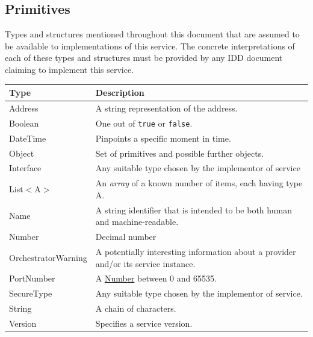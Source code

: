 \documentclass[a4paper]{arrowhead}
\newcommand{\pdef}[1]{{\textcolor{ArrowheadGrey}{#1\label{sec:model:primitives:#1}\label{sec:model:primitives:#1s}\label{sec:model:primitives:#1es}}}}
\newcommand{\pref}[1]{{\textcolor{ArrowheadGrey}{\hyperref[sec:model:primitives:#1]{#1}}}}
\begin{document}
\subsection{Primitives}
\label{sec:model:primitives}

Types and structures mentioned throughout this document that are assumed to be available to implementations of this service.
The concrete interpretations of each of these types and structures must be provided by any IDD document claiming to implement this service.


\begin{table}[ht!]
\begin{tabularx}{\textwidth}{| p{4cm} | X |} \hline
\rowcolor{gray!33} Type & Description \\ \hline
\pdef{Address}          & A string representation of the address. \\ \hline
\pdef{Boolean}          & One out of \texttt{true} or \texttt{false}. \\ \hline
\pdef{DateTime}         & Pinpoints a specific moment in time. \\ \hline
\pdef{Object}           & Set of primitives and possible further objects. \\ \hline
\pdef{Interface}        & Any suitable type chosen by the implementor of service \\ \hline
\pdef{List}$<$A$>$      & An \textit{array} of a known number of items, each having type A. \\ \hline
\pdef{Name}             & A string identifier that is intended to be both human and machine-readable. \\ \hline
\pdef{Number}           & Decimal number \\ \hline
\pdef{OrchestratorWarning} & A potentially interesting information about a provider and/or its service instance. \\ \hline
\pdef{PortNumber}       & A \pref{Number} between 0 and 65535. \\ \hline
\pdef{SecureType}       & Any suitable type chosen by the implementor of service. \\ \hline
\pdef{String}           & A chain of characters. \\ \hline
\pdef{Version}          & Specifies a service version. \\ \hline
\end{tabularx}
\end{table}

\newpage



\end{document}
